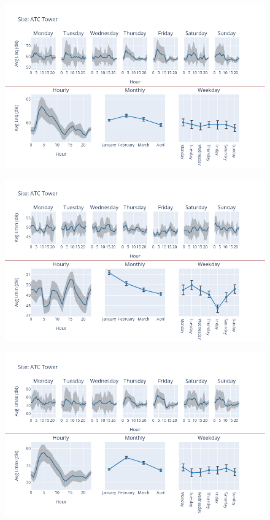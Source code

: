 \documentclass[12pt, oneside]{book}
\begin{document}
{ 
{\begin{figure}[H] 
 \centering 
\includegraphics[width=.88\textwidth, keepaspectratio]{image59} 
 \end{figure}}{} 

{\begin{figure}[H] 
 \centering 
\includegraphics[width=.88\textwidth, keepaspectratio]{image60} 
 \end{figure}}{} 

{\begin{figure}[H] 
 \centering 
\includegraphics[width=.88\textwidth, keepaspectratio]{image61} 
 \end{figure}}{} 


}
\end{document}
